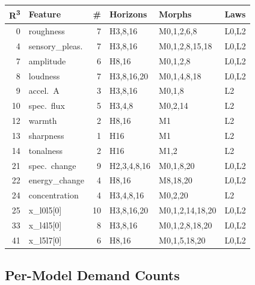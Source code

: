{\footnotesize
\begin{longtable}{@{}r l r l l l@{}}
\toprule
\textbf{R\textsuperscript{3}} & \textbf{Feature} & \textbf{\#}
  & \textbf{Horizons} & \textbf{Morphs} & \textbf{Laws} \\
\midrule
\endfirsthead
\midrule
\endhead
\endfoot
\bottomrule
\endlastfoot

\rowcolor{grpA}
0 & roughness & 7 & H3,8,16 & M0,1,2,6,8 & L0,L2 \\
\rowcolor{grpA}
4 & sensory\_pleas. & 7 & H3,8,16 & M0,1,2,8,15,18 & L0,L2 \\
\rowcolor{grpB}
7 & amplitude & 6 & H8,16 & M0,1,2,8 & L0,L2 \\
\rowcolor{grpB}
8 & loudness & 7 & H3,8,16,20 & M0,1,4,8,18 & L0,L2 \\
\rowcolor{grpB}
9 & accel.~A & 3 & H3,8,16 & M0,1,8 & L2 \\
\rowcolor{grpB}
10 & spec.~flux & 5 & H3,4,8 & M0,2,14 & L2 \\
\rowcolor{grpC}
12 & warmth & 2 & H8,16 & M1 & L2 \\
\rowcolor{grpC}
13 & sharpness & 1 & H16 & M1 & L2 \\
\rowcolor{grpC}
14 & tonalness & 2 & H16 & M1,2 & L2 \\
\rowcolor{grpD}
21 & spec.~change & 9 & H2,3,4,8,16 & M0,1,8,20 & L0,L2 \\
\rowcolor{grpD}
22 & energy\_change & 4 & H8,16 & M8,18,20 & L0,L2 \\
\rowcolor{grpD}
24 & concentration & 4 & H3,4,8,16 & M0,2,20 & L2 \\
\rowcolor{grpE}
25 & x\_l0l5[0] & 10 & H3,8,16,20 & M0,1,2,14,18,20 & L0,L2 \\
\rowcolor{grpE}
33 & x\_l4l5[0] & 8 & H3,8,16 & M0,1,2,8,18,20 & L0,L2 \\
\rowcolor{grpE}
41 & x\_l5l7[0] & 6 & H8,16 & M0,1,5,18,20 & L0,L2 \\
\end{longtable}
}


\subsection{Per-Model Demand Counts}
\label{subsec:routing-per-model}

